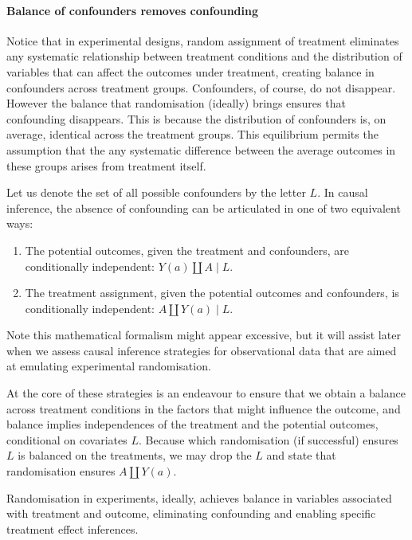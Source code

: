 \documentclass[
  singlecolumn]{article}
\let\oldparagraph\paragraph
\renewcommand{\paragraph}[1]{\oldparagraph{#1}\mbox{}}
\providecommand{\tightlist}{%
  \setlength{\itemsep}{0pt}\setlength{\parskip}{0pt}}\usepackage{longtable,booktabs,array}
\begin{document}
\paragraph{Balance of confounders removes
confounding}\label{balance-of-confounders-removes-confounding}

Notice that in experimental designs, random assignment of treatment
eliminates any systematic relationship between treatment conditions and
the distribution of variables that can affect the outcomes under
treatment, creating balance in confounders across treatment groups.
Confounders, of course, do not disappear. However the balance that
randomisation (ideally) brings ensures that confounding disappears. This
is because the distribution of confounders is, on average, identical
across the treatment groups. This equilibrium permits the assumption
that the any systematic difference between the average outcomes in these
groups arises from treatment itself.

Let us denote the set of all possible confounders by the letter \(L\).
In causal inference, the absence of confounding can be articulated in
one of two equivalent ways:

\begin{enumerate}
\def\labelenumi{\arabic{enumi}.}
\tightlist
\item
  The potential outcomes, given the treatment and confounders, are
  conditionally independent: \(Y(a) \coprod A \mid L\).
\item
  The treatment assignment, given the potential outcomes and
  confounders, is conditionally independent: \(A \coprod Y(a) \mid L\).
\end{enumerate}

Note this mathematical formalism might appear excessive, but it will
assist later when we assess causal inference strategies for
observational data that are aimed at emulating experimental
randomisation.

At the core of these strategies is an endeavour to ensure that we obtain
a balance across treatment conditions in the factors that might
influence the outcome, and balance implies independences of the
treatment and the potential outcomes, conditional on covariates \(L\).
Because which randomisation (if successful) ensures \(L\) is balanced on
the treatments, we may drop the \(L\) and state that randomisation
ensures \(A \coprod Y(a)\).

Randomisation in experiments, ideally, achieves balance in variables
associated with treatment and outcome, eliminating confounding and
enabling specific treatment effect inferences.
\end{document}
